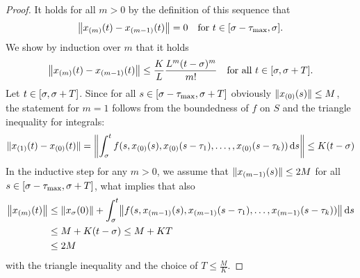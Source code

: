 \begin{proof}
        It holds for all $m>0$ by the definition of this sequence that
        \begin{equation*}
            \nnorm*{\seq{x}{m}(t)-\seq{x}{m-1}(t)} = 0 \quad\text{for } t\in \compactum{\tzero-\taumax}{\tzero}.
        \end{equation*}
        We show by induction over $m$ that it holds
        \begin{equation*}
            \nnorm*{\seq{x}{m}(t)-\seq{x}{m-1}(t)} \leq \frac{K}{L}\frac{L^m (t-\tzero)^m}{m!} \quad\text{for all } t\in [\tzero,\tzero+T].
        \end{equation*}
        Let $t\in [\tzero,\tzero+T]$. Since for all $s\in [\tzero-\taumax,\tzero+T]$ obviously $\nnorm{\seq{x}{0}(s)}\leq M$, the statement for $m=1$ follows from the boundedness of $f$ on $S$ and the triangle inequality for integrals:
        \begin{equation*}
            \nnorm{\seq{x}{1}(t)-\seq{x}{0}(t)} = \nnorm*{\integral{\tzero}{t} f(s,\seq{x}{0}(s),\seq{x}{0}(s-\tau_1),\ldots,,\seq{x}{0}(s-\tau_k))\dx[s]} \leq K(t-\tzero)
        \end{equation*}
        In the inductive step for any $m>0$, we assume that $\nnorm{\seq{x}{m-1}(s)}\leq 2M$ for all $s\in [\tzero-\taumax,\tzero+T]$, what implies that also
        \begin{align}\label{eq:bounded-xm}
            \nnorm*{\seq{x}{m}(t)} &\leq \nnorm*{x_\tzero(0)} + \integral{\tzero}{t} \nnorm*{f(s,\seq{x}{m-1}(s),\seq{x}{m-1}(s-\tau_1),\ldots,\seq{x}{m-1}(s-\tau_k))}\dx[s] \nonumber \\
            &\leq M + K(t-\tzero) \leq M+KT \nonumber \\
            &\leq 2M
        \end{align}
        with the triangle inequality and the choice of $T\leq\frac{M}{K}$.


\end{proof}
